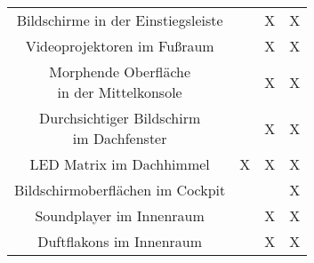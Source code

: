 \begin{table}[hbt]
\begin{tabular}{c|ccc}
		\parbox[t]{0.4\linewidth}{\centering Bildschirme in der Einstiegsleiste} &  & X & X \\
		\parbox[t]{0.4\linewidth}{\centering Videoprojektoren im Fußraum} &  & X & X \\
		\parbox[t]{0.4\linewidth}{\centering Morphende Oberfläche\\in der Mittelkonsole} &  & X & X \\
		\parbox[t]{0.4\linewidth}{\centering Durchsichtiger Bildschirm\\im Dachfenster} &  & X & X \\
		LED Matrix im Dachhimmel & X & X & X \\
		\parbox[t]{0.4\linewidth}{\centering Bildschirmoberflächen im Cockpit} &  &  & X \\
		\parbox[t]{0.4\linewidth}{\centering Soundplayer im Innenraum} &  & X & X \\
		\parbox[t]{0.4\linewidth}{\centering Duftflakons im Innenraum} &  & X & X \\
	\end{tabular} 
\end{table}

